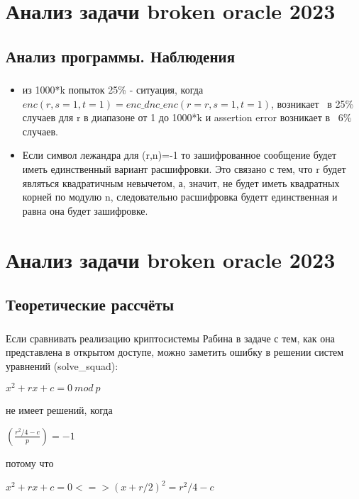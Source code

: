 \documentclass[t]{beamer}
\begin{document}
\section{Анализ задачи broken oracle 2023}
\subsection{Анализ программы. Наблюдения}
\begin{frame}
	\frametitle{\insertsection}
	\framesubtitle{\insertsubsection}
    \begin{itemize}
        \item из 1000*k попыток 25\% - ситуация, когда $enc(r,s=1,t=1)=enc\_dnc\_enc(r=r,s=1,t=1)$, возникает ~в 25\% случаев для r в диапазоне от 1 до 1000*k и assertion error возникает в ~6\% случаев.
        \item Если символ лежандра для (r,n)=-1 то зашифрованное сообщение будет иметь единственный вариант расшифровки. Это связано с тем, что r будет являться квадратичным невычетом, а, значит, не будет иметь квадратных корней по модулю n, следовательно расшифровка будетт единственная и равна она будет зашифровке.
    \end{itemize}
\end{frame}

\section{Анализ задачи broken oracle 2023}
\subsection{Теоретические рассчёты}
\begin{frame}[t] %
	\frametitle{\insertsection}
	\framesubtitle{\insertsubsection}
            Если сравнивать реализацию криптосистемы Рабина в задаче с тем, как она представлена в открытом доступе, можно заметить ошибку в решении систем уравнений (solve\_squad):
        \begin{center}
            $x^2+rx+c=0\ mod\ p$
        \end{center}
            не имеет решений, когда
        \begin{center}
            $\left( \frac{r^2/4-c}{p}\right)=-1$
        \end{center}
            потому что
        \begin{center}
        $x^2+rx+c=0<=>(x+r/2)^2=r^2/4-c$
        \end{center}
\end{frame}
\end{document}
